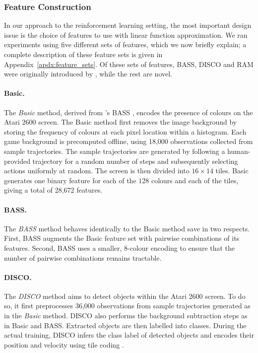 \documentclass[twoside,11pt]{article}
\begin{document}
\subsubsection{Feature Construction}
In our approach to the reinforcement learning setting, the most important design issue is the choice of features to use with linear function approximation.
We ran experiments using five different sets of features, which we now briefly explain;
a complete description of these feature sets is given in Appendix~\ref{apdx:feature_sets}. Of these
sets of features, BASS, DISCO and RAM were originally introduced by , while the rest are novel.

\paragraph{Basic.}
The \emph{Basic} method, derived from \citeauthor{naddaf2010}'s BASS \citeyear{naddaf2010}, encodes the presence of colours on the Atari 2600 screen.
The Basic method first removes the image background by storing the frequency of colours at each pixel location within a histogram. 
Each game background is precomputed offline, using 18,000 observations collected from sample trajectories. The sample trajectories are generated by following a human-provided trajectory for a random number of steps and subsequently selecting actions uniformly at random.  
The screen is then divided into $16 \times 14$ tiles. 
Basic generates one binary feature for each of the $128$ colours and each of the tiles, giving a total of 28,672 features.

\paragraph{BASS.} The \emph{BASS} method behaves identically to the Basic method save in two respects. First, BASS augments the Basic feature set with pairwise combinations of its features. Second, BASS uses a smaller, 8-colour encoding to ensure that the number of pairwise combinations remains tractable. 

\paragraph{DISCO.} The \emph{DISCO} method aims to detect objects within the Atari 2600 screen. To do so, it first preprocesses 36,000 observations from sample trajectories generated as in the \emph{Basic} method. DISCO also performs the background subtraction steps as in Basic and BASS. Extracted objects are then labelled into classes. During the actual training, DISCO infers the class label of detected objects and encodes their position and velocity using tile coding \cite{sutton_barto_98}.
\end{document}
